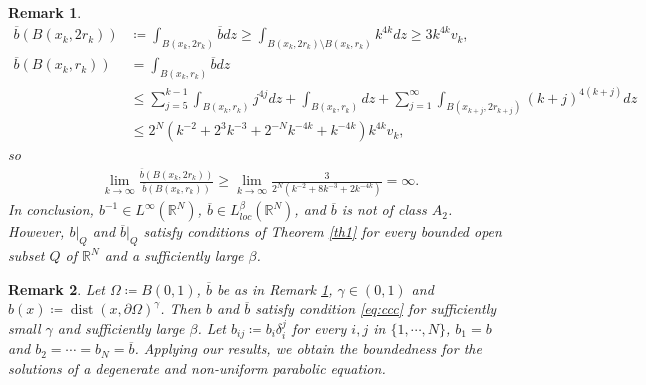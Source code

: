 \documentclass[11pt, a4paper]{article}
\newtheorem{remark}{Remark}%
\numberwithin{equation}{section}
\newcommand{\RR}{{\mathbb R}}
\DeclareMathOperator{\dist}{{dist}}
\begin{document}
\begin{remark}
\begin{align*}
  \overline{b}(B(x_{k},2r_{k}))
  &\coloneqq \int_{B(x_{k},2r_{k})}\overline{b}dz \ge
    \int_{B(x_{k},2r_{k})\setminus B(x_{k},r_{k})} k^{4k}dz\ge
    3k^{4k}v_{k},\\
  \overline{b}(B(x_{k},r_{k}))
  &= \int_{B(x_{k},r_{k})} \overline{b}dz \\
 &\le  \sum_{j=5}^{k-1}\int_{B(x_{k},r_{k})} j^{4j}dz+
    \int_{B(x_{k},r_{k})}dz+
    \sum_{j=1}^{\infty}\int_{B(x_{k+j},2r_{k+j})} (k+j)^{4(k+j)}dz\\
  &\le 2^{N} \left(k^{-2}+2^{3}k^{-3}+ 2^{-N} k^{-4k}+
 k^{-4k} \right)k^{4k}v_{k},
\end{align*}
so 
\begin{align*}
\lim_{k\to\infty}
 \frac{\overline{b} \left(B(x_{k},2r_{k}) \right)}{\overline{b} \left(B(x_{k},r_{k}) \right)}\ge
 \lim_{k\to\infty}\frac{3}{2^{N}(k^{-2}+ 8k^{-3} +  2k^{-4k})}=\infty.
\end{align*}
In conclusion, $b^{-1} \in L^{\infty}(\RR^{N})$,
$\overline{b} \in L_{loc}^{\beta}(\RR^{N})$, and $\overline{b}$ is not
of class $A_{2}$.  However, $b\vert_{Q}$ and $\overline{b}\vert_{Q}$
satisfy conditions of Theorem \ref{th1} for every bounded open subset
$Q$ of $\RR^{N}$ and a sufficiently large $\beta$.
 \label{r4}
\end{remark}

\begin{remark} Let $\Omega\coloneqq B(0,1)$, $\overline{b}$ be as in
  Remark \ref{r4}, $\gamma\in (0,1)$ and
  $b(x)\coloneqq \dist(x,\partial\Omega)^{\gamma}$. Then $b$ and
  $\overline{b}$ satisfy condition  \eqref{eq:ccc} for sufficiently small $\gamma$ and sufficiently large
  $\beta$. Let $b_{ij}\coloneqq b_{i}\delta_{i}^{j}$ for every $i,j$
  in $\{1,\cdots,N\}$, $b_{1}=b$ and
  $b_{2}=\cdots= b_{N}=\overline{b}$. Applying our results, we obtain
  the boundedness for the solutions of a degenerate and non-uniform
  parabolic equation.
\label{r4b}
\end{remark}







%

% 
\end{document}
